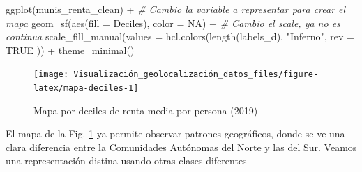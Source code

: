 \documentclass[
]{report}
\newenvironment{Shaded}{\begin{snugshade}}{\end{snugshade}}
\newcommand{\AttributeTok}[1]{\textcolor[rgb]{0.77,0.63,0.00}{#1}}
\newcommand{\CommentTok}[1]{\textcolor[rgb]{0.56,0.35,0.01}{\textit{#1}}}
\newcommand{\ConstantTok}[1]{\textcolor[rgb]{0.00,0.00,0.00}{#1}}
\newcommand{\FunctionTok}[1]{\textcolor[rgb]{0.00,0.00,0.00}{#1}}
\newcommand{\NormalTok}[1]{#1}
\newcommand{\OtherTok}[1]{\textcolor[rgb]{0.56,0.35,0.01}{#1}}
\newcommand{\SpecialCharTok}[1]{\textcolor[rgb]{0.00,0.00,0.00}{#1}}
\newcommand{\StringTok}[1]{\textcolor[rgb]{0.31,0.60,0.02}{#1}}
\theoremstyle{definition}
\theoremstyle{definition}
\theoremstyle{definition}
\theoremstyle{definition}
\theoremstyle{remark}
\begin{document}
\begin{Shaded}
\begin{Highlighting}[]
\FunctionTok{ggplot}\NormalTok{(munis\_renta\_clean) }\SpecialCharTok{+}
  \CommentTok{\# Cambio la variable a representar para crear el mapa}
  \FunctionTok{geom\_sf}\NormalTok{(}\FunctionTok{aes}\NormalTok{(}\AttributeTok{fill =}\NormalTok{ Deciles), }\AttributeTok{color =} \ConstantTok{NA}\NormalTok{) }\SpecialCharTok{+}
  \CommentTok{\# Cambio el scale, ya no es continua}
  \FunctionTok{scale\_fill\_manual}\NormalTok{(}\AttributeTok{values =} \FunctionTok{hcl.colors}\NormalTok{(}\FunctionTok{length}\NormalTok{(labels\_d),}
    \StringTok{"Inferno"}\NormalTok{,}
    \AttributeTok{rev =} \ConstantTok{TRUE}
\NormalTok{  )) }\SpecialCharTok{+}
  \FunctionTok{theme\_minimal}\NormalTok{()}
\end{Highlighting}
\end{Shaded}

\begin{figure}

{\centering \texttt{[image: Visualización\_geolocalización\_datos\_files/figure-latex/mapa-deciles-1]} 

}

\caption{Mapa por deciles de renta media por persona (2019)}\label{fig:mapa-deciles}
\end{figure}

El mapa de la Fig. \ref{fig:mapa-deciles} ya permite observar patrones
geográficos, donde se ve una clara diferencia entre la Comunidades Autónomas del
Norte y las del Sur. Veamos una representación distina usando otras clases
diferentes

\begin{Shaded}
\end{Shaded}
\end{document}
